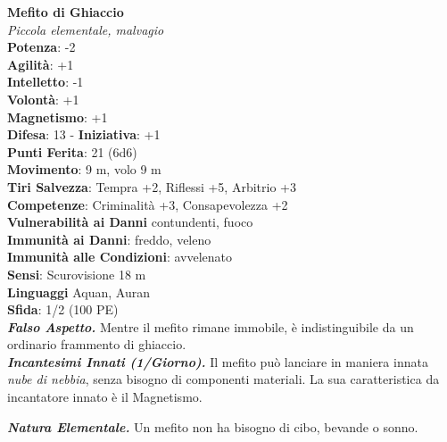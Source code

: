 \begin{multicols}{2}
\medskip\textbf{Mefito di Ghiaccio}\\
\emph{Piccola elementale, malvagio}\\
\textbf{Potenza}: -2\\
\textbf{Agilità}: +1\\
\textbf{Intelletto}: -1\\
\textbf{Volontà}: +1\\
\textbf{Magnetismo}: +1\\
\textbf{Difesa}: 13 - \textbf{Iniziativa}: +1\\
\textbf{Punti Ferita}: 21 (6d6)\\
\textbf{Movimento}: 9 m, volo 9 m \\
\textbf{Tiri Salvezza}: Tempra +2, Riflessi +5, Arbitrio +3\\
\textbf{Competenze}: Criminalità +3, Consapevolezza +2\\
\textbf{Vulnerabilità ai Danni} contundenti, fuoco\\
\textbf{Immunità ai Danni}: freddo, veleno\\
\textbf{Immunità alle Condizioni}: avvelenato\\
\textbf{Sensi}: Scurovisione 18 m\\
\textbf{Linguaggi} Aquan, Auran\\
\textbf{Sfida}: 1/2 (100 PE)\smallskip\\
\emph{\textbf{Falso Aspetto.}} Mentre il mefito rimane immobile, è indistinguibile da un ordinario frammento di ghiaccio.\\
\emph{\textbf{Incantesimi Innati (1/Giorno).}} Il mefito può lanciare in maniera innata \emph{nube di nebbia}, senza bisogno di componenti materiali. La sua caratteristica da incantatore innato è il Magnetismo.

\emph{\textbf{Natura Elementale.}} Un mefito non ha bisogno di cibo, bevande o sonno.\\


\end{multicols}
